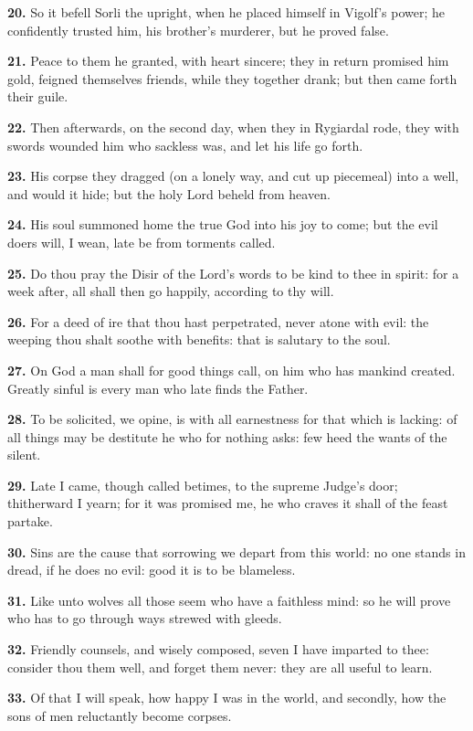 \textbf{20.} So it befell Sorli the upright, when he placed himself in
Vigolf's power; he confidently trusted him, his brother's murderer,
but he proved false.

\textbf{21.} Peace to them he granted, with heart sincere; they in return
promised him gold, feigned themselves friends, while they together
drank; but then came forth their guile.

\textbf{22.} Then afterwards, on the second day, when they in Rygiardal rode,
they with swords wounded him who sackless was, and let his life go
forth.

\textbf{23.} His corpse they dragged (on a lonely way, and cut up piecemeal)
into a well, and would it hide; but the holy Lord beheld from heaven.

\textbf{24.} His soul summoned home the true God into his joy to come; but
the evil doers will, I wean, late be from torments called.

\textbf{25.} Do thou pray the Disir of the Lord's words to be kind to thee in
spirit: for a week after, all shall then go happily, according to thy
will.

\textbf{26.} For a deed of ire that thou hast perpetrated, never atone with
evil: the weeping thou shalt soothe with benefits: that is salutary to
the soul.

\textbf{27.} On God a man shall for good things call, on him who has mankind
created. Greatly sinful is every man who late finds the Father.

\textbf{28.} To be solicited, we opine, is with all earnestness for that
which is lacking: of all things may be destitute he who for nothing
asks: few heed the wants of the silent.

\textbf{29.} Late I came, though called betimes, to the supreme Judge's door;
thitherward I yearn; for it was promised me, he who craves it shall of
the feast partake.

\textbf{30.} Sins are the cause that sorrowing we depart from this world: no
one stands in dread, if he does no evil: good it is to be blameless.

\textbf{31.} Like unto wolves all those seem who have a faithless mind: so he
will prove who has to go through ways strewed with gleeds.

\textbf{32.} Friendly counsels, and wisely composed, seven I have imparted to
thee: consider thou them well, and forget them never: they are all
useful to learn.

\textbf{33.} Of that I will speak, how happy I was in the world, and
secondly, how the sons of men reluctantly become corpses.

